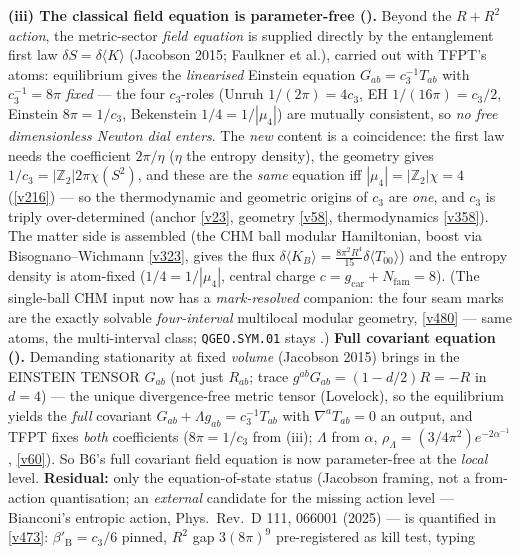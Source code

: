 \documentclass[11pt,a4paper]{article}
\newcommand{\cthree}{c_3}
\newcommand{\Nfam}{N_{\mathrm{fam}}}
\newcommand{\Z}{\mathbb{Z}}
\begin{document}
\begin{keybox}
\textbf{(iii) The classical field equation is parameter-free ().} Beyond
the $R{+}R^2$ \emph{action}, the metric-sector \emph{field equation} is supplied directly by the entanglement first
law $\delta S=\delta\langle K\rangle$ (Jacobson 2015; Faulkner et al.), carried out with TFPT's atoms: equilibrium
gives the \emph{linearised} Einstein equation $G_{ab}=\cthree^{-1}T_{ab}$ with $\cthree^{-1}=8\pi$ \emph{fixed} ---
the four $\cthree$-roles (Unruh $1/(2\pi){=}4\cthree$, EH $1/(16\pi){=}\cthree/2$, Einstein $8\pi{=}1/\cthree$,
Bekenstein $1/4{=}1/|\mu_4|$) are mutually consistent, so \emph{no free dimensionless Newton dial enters}. The
\emph{new} content is a coincidence: the first law needs the coefficient $2\pi/\eta$ ($\eta$ the entropy density),
the geometry gives $1/\cthree=|\Z_2|2\pi\chi(S^2)$, and these are the \emph{same} equation iff $|\mu_4|=|\Z_2|\chi=4$
(\vref{v216}) --- so the thermodynamic and geometric origins of $\cthree$ are \emph{one}, and $\cthree$ is triply
over-determined (anchor \vref{v23}, geometry \vref{v58}, thermodynamics \vref{v358}). The matter side is assembled
(the CHM ball modular Hamiltonian, boost via Bisognano--Wichmann \vref{v323}, gives the flux
$\delta\langle K_B\rangle=\tfrac{8\pi^2R^4}{15}\delta\langle T_{00}\rangle$) and the entropy density is atom-fixed
($1/4{=}1/|\mu_4|$, central charge $c=g_{\mathrm{car}}{+}\Nfam=8$). (The single-ball CHM input now has a
\emph{mark-resolved} companion: the four seam marks are the exactly solvable \emph{four-interval} multilocal
modular geometry, \vref{v480} --- same atoms, the multi-interval class; \texttt{QGEO.SYM.01} stays \mO.) \textbf{Full covariant equation
().} Demanding stationarity at fixed \emph{volume} (Jacobson 2015) brings in
the EINSTEIN TENSOR $G_{ab}$ (not just $R_{ab}$; trace $g^{ab}G_{ab}=(1-d/2)R=-R$ in $d{=}4$) --- the unique
divergence-free metric tensor (Lovelock), so the equilibrium yields the \emph{full} covariant
$G_{ab}+\Lambda g_{ab}=\cthree^{-1}T_{ab}$ with $\nabla^aT_{ab}{=}0$ an output, and TFPT fixes \emph{both}
coefficients ($8\pi{=}1/\cthree$ from (iii); $\Lambda$ from $\alpha$, $\rho_\Lambda=(3/4\pi^2)e^{-2\alpha^{-1}}$,
\vref{v60}). So B6's full covariant field equation is now parameter-free at the \emph{local} level. \textbf{Residual:}
only the equation-of-state status (Jacobson framing, not a from-action quantisation; an \emph{external} candidate
for the missing action level --- Bianconi's entropic action, Phys.\ Rev.\ D 111, 066001 (2025) --- is quantified in
\vref{v473}: $\beta'_{\mathrm B}=\cthree/6$ pinned, $R^2$ gap $3(8\pi)^9$ pre-registered as kill test, typing

\end{keybox}
\end{document}
